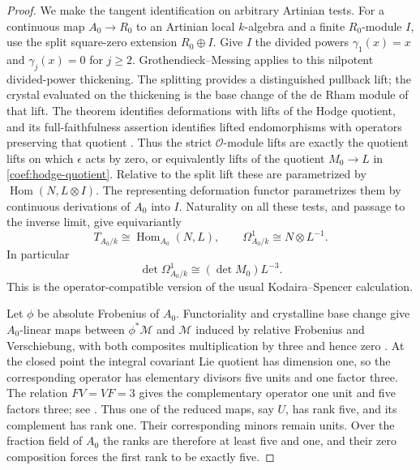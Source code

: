 \documentclass[11pt]{article}
\theoremstyle{definition}
\theoremstyle{remark}
\numberwithin{equation}{section}
\begin{document}
\begin{proof}
We make the tangent identification on arbitrary Artinian tests.
For a continuous map \(A_0\to R_0\) to an Artinian local
\(k\)-algebra and a finite \(R_0\)-module \(I\), use the split
square-zero extension \(R_0\oplus I\).
Give \(I\) the divided powers \(\gamma_1(x)=x\) and
\(\gamma_j(x)=0\) for \(j\ge2\).
Grothendieck--Messing applies to this nilpotent divided-power
thickening.  The splitting provides a distinguished pullback lift;
the crystal evaluated on the thickening is the base change of
the de Rham module of that lift.
The theorem identifies deformations with lifts of the Hodge
quotient, and its full-faithfulness assertion identifies lifted
endomorphisms with operators preserving that quotient
\cite[Remark~2.3(iii), Theorem~2.4(ii),(iv)]{ChaiOort}.
Thus the strict \(\mathcal O\)-module lifts are exactly the quotient
lifts on which \(\epsilon\) acts by zero, or equivalently lifts of
the quotient \(M_0\to L\) in \eqref{coef:hodge-quotient}.
Relative to the split lift these are parametrized by
\(\operatorname{Hom}(N,L\otimes I)\).
The representing deformation functor parametrizes them by
continuous derivations of \(A_0\) into \(I\).
Naturality on all these tests, and passage to the inverse limit,
give equivariantly
\[
 T_{A_0/k}\cong\operatorname{Hom}_{A_0}(N,L),\qquad
 \Omega^1_{A_0/k}\cong N\otimes L^{-1}.
\]
In particular
\begin{equation}\label{coef:canonical-line}
 \det\Omega^1_{A_0/k}\cong(\det M_0)L^{-3}.
\end{equation}
This is the operator-compatible version of the usual
Kodaira--Spencer calculation.

Let \(\phi\) be absolute Frobenius of \(A_0\).
Functoriality and crystalline base change give \(A_0\)-linear
maps between \(\phi^*\mathcal M\) and \(\mathcal M\) induced by
relative Frobenius and Verschiebung, with both composites multiplication
by three and hence zero
\cite[Section~2.2, Equation~(2.4), pp.~24--25]{BerthelotMessing}.
At the closed point the integral covariant Lie quotient has dimension
one, so the corresponding operator has elementary divisors five units
and one factor three.  The relation \(FV=VF=3\) gives the complementary
operator one unit and five factors three; see
\cite[Theorem~4.33(3) and Remark~4.34(2)]{ChaiOort}.
Thus one of the reduced maps, say \(U\), has rank five, and its
complement has rank one.  Their corresponding minors remain units.  Over the
fraction field of \(A_0\) the ranks are therefore at least five
and one, and their zero composition forces the first rank to
be exactly five.


\end{proof}
\end{document}
